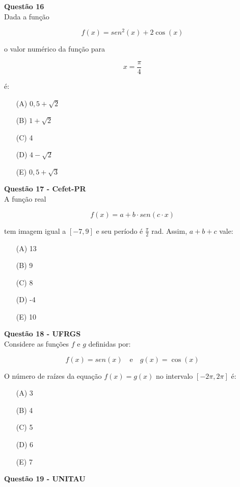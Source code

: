 \documentclass[12pt]{article}
\begin{document}
\begin{multicols}{2}
\vspace{0.3cm}

\textbf{Questão 16} \\

Dada a função

\[
f(x) = sen^{2}(x) + 2\cos(x)
\]

o valor numérico da função para 

\[
x = \frac{\pi}{4}
\]

é:

\begin{itemize}
    \item[(A)] \(0,5 + \sqrt{2}\)
    \item[(B)] \(1 + \sqrt{2}\)
    \item[(C)] 4
    \item[(D)] \(4 - \sqrt{2}\)
    \item[(E)] \(0,5 + \sqrt{3}\)
\end{itemize}
\textbf{Questão 17 - Cefet-PR} \\

A função real 

\[
f(x) = a + b \cdot sen(c \cdot x)
\]

tem imagem igual a \([-7, 9]\) e seu período é \(\frac{\pi}{2}\) rad. Assim, \(a + b + c\) vale:

\begin{itemize}
    \item[(A)] 13
    \item[(B)] 9
    \item[(C)] 8
    \item[(D)] -4
    \item[(E)] 10
\end{itemize}

\vspace{0.3cm}

\textbf{Questão 18 - UFRGS} \\

Considere as funções \(f\) e \(g\) definidas por:

\[
f(x) = sen(x) \quad \text{e} \quad g(x) = \cos(x)
\]

O número de raízes da equação \(f(x) = g(x)\) no intervalo \([-2\pi, 2\pi]\) é:

\begin{itemize}
    \item[(A)] 3
    \item[(B)] 4
    \item[(C)] 5
    \item[(D)] 6
    \item[(E)] 7
\end{itemize}
\textbf{Questão 19 - UNITAU} \\


\end{multicols}
\end{document}
